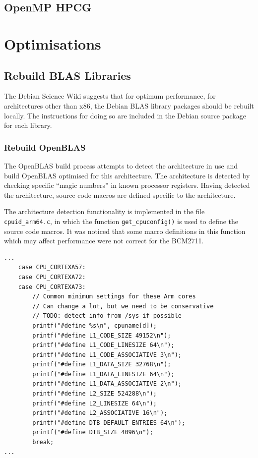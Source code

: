 \documentclass{report}
\begin{document}
%
%
\subsection{OpenMP HPCG}


%
%
\section{Optimisations}


%
%
\subsection{Rebuild BLAS Libraries}

The Debian Science Wiki suggests that for optimum performance, for architectures other than x86, the Debian BLAS library packages should be rebuilt locally. The instructions for doing so are included in the Debian source package for each library.


%
%
\subsubsection{Rebuild OpenBLAS}
The OpenBLAS build process attempts to detect the architecture in use and build OpenBLAS optimised for this architecture. The architecture is detected by checking specific ``magic numbers'' in known processor registers. Having detected the architecture, source code macros are defined specific to the architecture. 

The architecture detection functionality is implemented in the file \verb|cpuid_arm64.c|, in which the function \verb|get_cpuconfig()| is used to define the source code macros. It was noticed that some macro definitions in this function which may affect performance were not correct for the BCM2711.

\lstset{style=listing}
\begin{lstlisting}[caption=cpuid\_arm64.c, numbers=none]
...
	case CPU_CORTEXA57:
	case CPU_CORTEXA72:
	case CPU_CORTEXA73:
		// Common minimum settings for these Arm cores
		// Can change a lot, but we need to be conservative
		// TODO: detect info from /sys if possible
		printf("#define %s\n", cpuname[d]);
		printf("#define L1_CODE_SIZE 49152\n");
		printf("#define L1_CODE_LINESIZE 64\n");
		printf("#define L1_CODE_ASSOCIATIVE 3\n");
		printf("#define L1_DATA_SIZE 32768\n");
		printf("#define L1_DATA_LINESIZE 64\n");
		printf("#define L1_DATA_ASSOCIATIVE 2\n");
		printf("#define L2_SIZE 524288\n");
		printf("#define L2_LINESIZE 64\n");
		printf("#define L2_ASSOCIATIVE 16\n");
		printf("#define DTB_DEFAULT_ENTRIES 64\n");
		printf("#define DTB_SIZE 4096\n");
		break;
...
\end{lstlisting}
\end{document}

